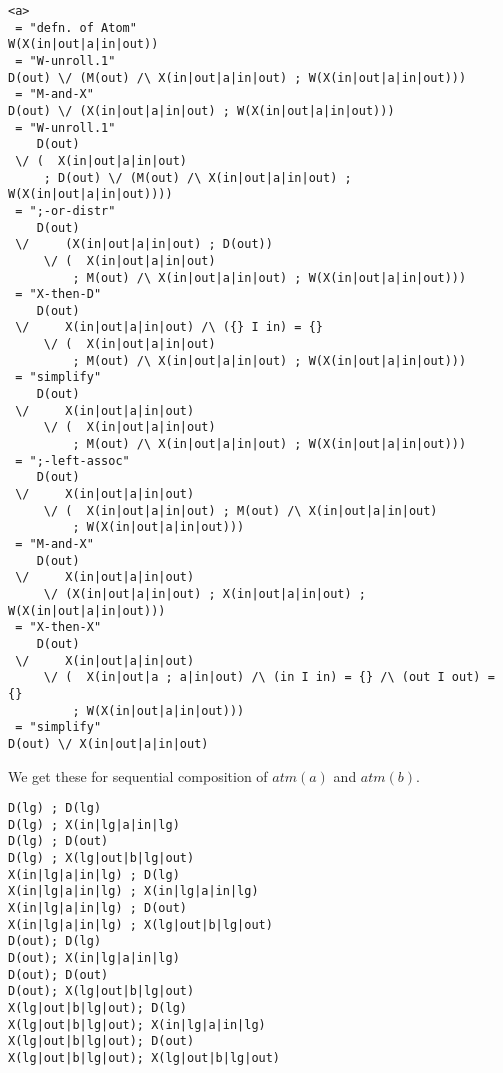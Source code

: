\label{ha:scratch}

{\footnotesize\begin{verbatim}
<a>
 = "defn. of Atom"
W(X(in|out|a|in|out))
 = "W-unroll.1"
D(out) \/ (M(out) /\ X(in|out|a|in|out) ; W(X(in|out|a|in|out)))
 = "M-and-X"
D(out) \/ (X(in|out|a|in|out) ; W(X(in|out|a|in|out)))
 = "W-unroll.1"
    D(out)
 \/ (  X(in|out|a|in|out)
     ; D(out) \/ (M(out) /\ X(in|out|a|in|out) ; W(X(in|out|a|in|out))))
 = ";-or-distr"
    D(out)
 \/     (X(in|out|a|in|out) ; D(out))
     \/ (  X(in|out|a|in|out)
         ; M(out) /\ X(in|out|a|in|out) ; W(X(in|out|a|in|out)))
 = "X-then-D"
    D(out)
 \/     X(in|out|a|in|out) /\ ({} I in) = {}
     \/ (  X(in|out|a|in|out)
         ; M(out) /\ X(in|out|a|in|out) ; W(X(in|out|a|in|out)))
 = "simplify"
    D(out)
 \/     X(in|out|a|in|out)
     \/ (  X(in|out|a|in|out)
         ; M(out) /\ X(in|out|a|in|out) ; W(X(in|out|a|in|out)))
 = ";-left-assoc"
    D(out)
 \/     X(in|out|a|in|out)
     \/ (  X(in|out|a|in|out) ; M(out) /\ X(in|out|a|in|out)
         ; W(X(in|out|a|in|out)))
 = "M-and-X"
    D(out)
 \/     X(in|out|a|in|out)
     \/ (X(in|out|a|in|out) ; X(in|out|a|in|out) ; W(X(in|out|a|in|out)))
 = "X-then-X"
    D(out)
 \/     X(in|out|a|in|out)
     \/ (  X(in|out|a ; a|in|out) /\ (in I in) = {} /\ (out I out) = {}
         ; W(X(in|out|a|in|out)))
 = "simplify"
D(out) \/ X(in|out|a|in|out)
\end{verbatim}}


\newpage
We get these for sequential composition of $atm(a)$ and $atm(b)$.
{\footnotesize\begin{verbatim}
D(lg) ; D(lg)
D(lg) ; X(in|lg|a|in|lg)
D(lg) ; D(out)
D(lg) ; X(lg|out|b|lg|out)
X(in|lg|a|in|lg) ; D(lg)
X(in|lg|a|in|lg) ; X(in|lg|a|in|lg)
X(in|lg|a|in|lg) ; D(out)
X(in|lg|a|in|lg) ; X(lg|out|b|lg|out)
D(out); D(lg)
D(out); X(in|lg|a|in|lg)
D(out); D(out)
D(out); X(lg|out|b|lg|out)
X(lg|out|b|lg|out); D(lg)
X(lg|out|b|lg|out); X(in|lg|a|in|lg)
X(lg|out|b|lg|out); D(out)
X(lg|out|b|lg|out); X(lg|out|b|lg|out)
\end{verbatim}}

